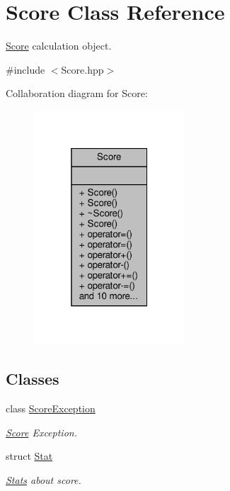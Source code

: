 \hypertarget{class_score}{}\section{Score Class Reference}
\label{class_score}


\hyperlink{class_score}{Score} calculation object.  




{\ttfamily \#include $<$Score.\+hpp$>$}



Collaboration diagram for Score\+:
\nopagebreak
\begin{figure}[H]
\begin{center}
\leavevmode
\includegraphics[width=160pt]{class_score__coll__graph}
\end{center}
\end{figure}
\subsection*{Classes}
\begin{DoxyCompactItemize}
\item 
class \hyperlink{class_score_1_1_score_exception}{Score\+Exception}
\begin{DoxyCompactList}\small\item\em \hyperlink{class_score}{Score} Exception. \end{DoxyCompactList}\item 
struct \hyperlink{struct_score_1_1_stat}{Stat}
\begin{DoxyCompactList}\small\item\em \hyperlink{class_stats}{Stats} about score. \end{DoxyCompactList}\end{DoxyCompactItemize}
